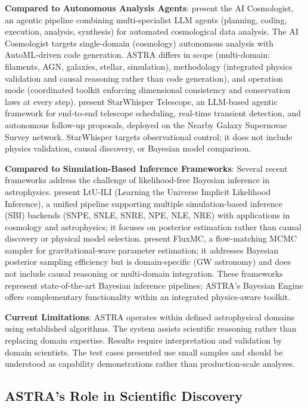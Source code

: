 \documentclass[usenatbib]{rasti}
\begin{document}
\textbf{Compared to Autonomous Analysis Agents}: \citet{moss2025aicosmologist} present the AI Cosmologist, an agentic pipeline combining multi-specialist LLM agents (planning, coding, execution, analysis, synthesis) for automated cosmological data analysis. The AI Cosmologist targets single-domain (cosmology) autonomous analysis with AutoML-driven code generation. ASTRA differs in scope (multi-domain: filaments, AGN, galaxies, stellar, simulation), methodology (integrated physics validation and causal reasoning rather than code generation), and operation mode (coordinated toolkit enforcing dimensional consistency and conservation laws at every step). \citet{wang2025starwhisper} present StarWhisper Telescope, an LLM-based agentic framework for end-to-end telescope scheduling, real-time transient detection, and autonomous follow-up proposals, deployed on the Nearby Galaxy Supernovae Survey network. StarWhisper targets observational control; it does not include physics validation, causal discovery, or Bayesian model comparison.

\textbf{Compared to Simulation-Based Inference Frameworks}: Several recent frameworks address the challenge of likelihood-free Bayesian inference in astrophysics. \citet{cranmer2024ltu} present LtU-ILI (Learning the Universe Implicit Likelihood Inference), a unified pipeline supporting multiple simulation-based inference (SBI) backends (SNPE, SNLE, SNRE, NPE, NLE, NRE) with applications in cosmology and astrophysics; it focuses on posterior estimation rather than causal discovery or physical model selection. \citet{liang2026fluxmc} present FluxMC, a flow-matching MCMC sampler for gravitational-wave parameter estimation; it addresses Bayesian posterior sampling efficiency but is domain-specific (GW astronomy) and does not include causal reasoning or multi-domain integration. These frameworks represent state-of-the-art Bayesian inference pipelines; ASTRA's Bayesian Engine offers complementary functionality within an integrated physics-aware toolkit.

\textbf{Current Limitations}: ASTRA operates within defined astrophysical domains using established algorithms. The system assists scientific reasoning rather than replacing domain expertise. Results require interpretation and validation by domain scientists. The test cases presented use small samples and should be understood as capability demonstrations rather than production-scale analyses.

\subsection{ASTRA's Role in Scientific Discovery}
\end{document}
